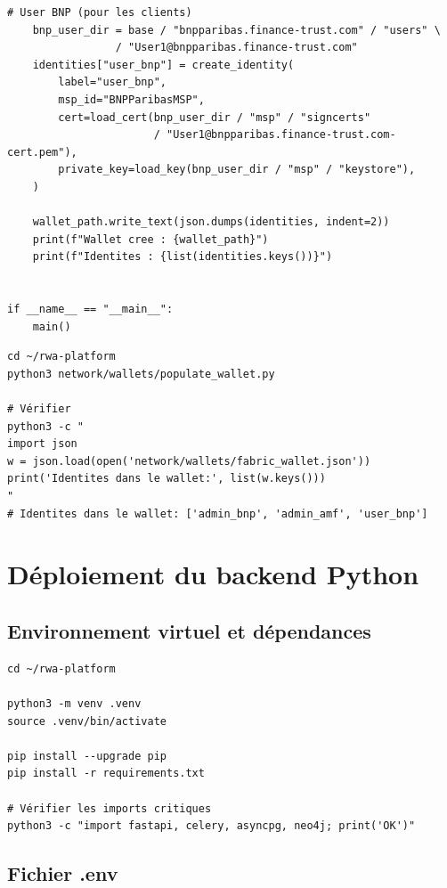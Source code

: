 \documentclass[12pt,a4paper,french]{article}
\begin{document}
\begin{lstlisting}[style=python, caption={network/wallets/populate\_wallet.py}]
    # User BNP (pour les clients)
    bnp_user_dir = base / "bnpparibas.finance-trust.com" / "users" \
                 / "User1@bnpparibas.finance-trust.com"
    identities["user_bnp"] = create_identity(
        label="user_bnp",
        msp_id="BNPParibasMSP",
        cert=load_cert(bnp_user_dir / "msp" / "signcerts"
                       / "User1@bnpparibas.finance-trust.com-cert.pem"),
        private_key=load_key(bnp_user_dir / "msp" / "keystore"),
    )

    wallet_path.write_text(json.dumps(identities, indent=2))
    print(f"Wallet cree : {wallet_path}")
    print(f"Identites : {list(identities.keys())}")


if __name__ == "__main__":
    main()
\end{lstlisting}

\begin{lstlisting}[style=bash, caption={Exécuter le script de population}]
cd ~/rwa-platform
python3 network/wallets/populate_wallet.py

# Vérifier
python3 -c "
import json
w = json.load(open('network/wallets/fabric_wallet.json'))
print('Identites dans le wallet:', list(w.keys()))
"
# Identites dans le wallet: ['admin_bnp', 'admin_amf', 'user_bnp']
\end{lstlisting}

\section{Déploiement du backend Python}

\subsection{Environnement virtuel et dépendances}

\begin{lstlisting}[style=bash, caption={Installer les dépendances Python}]
cd ~/rwa-platform

python3 -m venv .venv
source .venv/bin/activate

pip install --upgrade pip
pip install -r requirements.txt

# Vérifier les imports critiques
python3 -c "import fastapi, celery, asyncpg, neo4j; print('OK')"
\end{lstlisting}

\subsection{Fichier .env}
\end{document}
